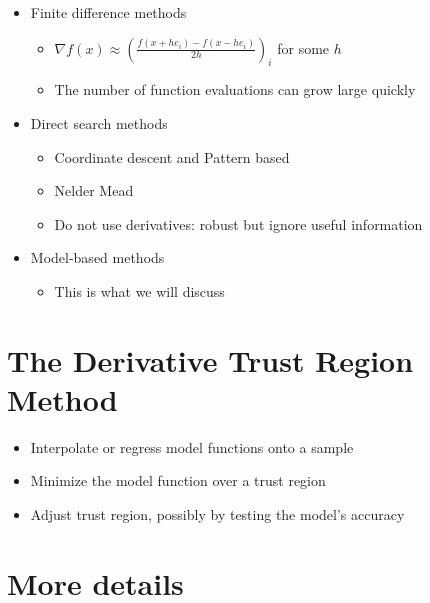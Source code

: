 \documentclass{article} %
\begin{document}
\begin{itemize}
\item Finite difference methods
	\begin{itemize}
	\item $\nabla f(x) \approx (\frac{f(x+he_i) - f(x-he_i)}{2h})_i$ for some $h$
	\item The number of function evaluations can grow large quickly
	\end{itemize}
\item Direct search methods
	\begin{itemize}
	\item Coordinate descent and Pattern based
	\item Nelder Mead
	\item Do not use derivatives: robust but ignore useful information
	\end{itemize}
\item Model-based methods
	\begin{itemize}
	\item This is what we will discuss
	\end{itemize}
\end{itemize}


\section{The Derivative Trust Region Method}

\begin{itemize}
	\item Interpolate or regress model functions onto a sample
	\item Minimize the model function over a trust region
	\item Adjust trust region, possibly by testing the model's accuracy
\end{itemize}




\section{More details}
\end{document}

